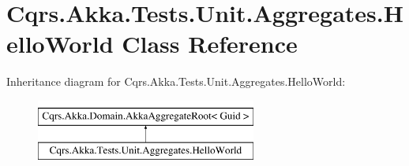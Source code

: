 \hypertarget{classCqrs_1_1Akka_1_1Tests_1_1Unit_1_1Aggregates_1_1HelloWorld}{}\section{Cqrs.\+Akka.\+Tests.\+Unit.\+Aggregates.\+Hello\+World Class Reference}
\label{classCqrs_1_1Akka_1_1Tests_1_1Unit_1_1Aggregates_1_1HelloWorld}
Inheritance diagram for Cqrs.\+Akka.\+Tests.\+Unit.\+Aggregates.\+Hello\+World\+:\begin{figure}[H]
\begin{center}
\leavevmode
\includegraphics[height=2.000000cm]{classCqrs_1_1Akka_1_1Tests_1_1Unit_1_1Aggregates_1_1HelloWorld}
\end{center}
\end{figure}
